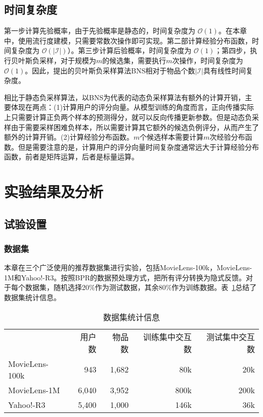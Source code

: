 \subsection{时间复杂度}
第一步计算先验概率，由于先验概率是静态的，时间复杂度为 $\mathcal{O}(1)$。在本章中，使用流行度建模，只需要常数次操作即可实现。第二部计算经验分布函数，时间复杂度为 $\mathcal{O}(\vert\mathcal{I}\vert)$）。第三步计算后验概率，时间复杂度为 $\mathcal{O}(1)$；第四步，执行贝叶斯负采样，对于规模为$m$的候选集，需要执行$m$次操作，时间复杂度为 $\mathcal{O}(1)$。因此，提出的贝叶斯负采样算法BNS相对于物品个数$|\mathcal{I}|$具有线性时间复杂度。

相比于静态负采样算法，以BNS为代表的动态负采样算法有额外的计算开销，主要体现在两点：(1)计算用户的评分向量。从模型训练的角度而言，正向传播实际上只需要计算正负两个样本的预测得分，就可以反向传播更新参数。但是动态负采样由于需要采样困难负样本，所以需要计算其它额外的候选负例评分，从而产生了额外的计算开销。(2)计算经验分布函数。$m$个候选样本需要计算$m$次经验分布函数。但是需要注意的是，计算用户的评分向量时间复杂度通常远大于计算经验分布函数，前者是矩阵运算，后者是标量运算。

\section{实验结果及分析}
\subsection{试验设置}
\subsubsection{数据集}
本章在三个广泛使用的推荐数据集进行实验，包括MovieLens-100k，MovieLens-1M和Yahoo!-R3\cite{Xuejiao:2020:ASC}。按照BPR\cite{Steffen:2009:UAI}的数据预处理方式，把所有评分转换为隐式反馈。对于每个数据集，随机选择20\%作为测试数据，其余80\%作为训练数据。表~\ref{3Table:Dataset}总结了数据集统计信息。
\begin{table}[h]
	\centering
	\small
	\caption{数据集统计信息}\label{3Table:Dataset}
	\begin{tabular}{lrrrr}
		\toprule[1.2pt]
		~           & 用户数   & 物品数   & 训练集中交互数  &测试集中交互数  \\ \cline{1-5}
		MovieLens-100k   &   943    &  1,682   &    80k	   & 20k 	\\
		MovieLens-1M    &   6,040  &  3,952   &   800k     & 200k  \\
		Yahoo!-R3       &   5,400  &  1,000   &   146k      & 36k  \\
		\bottomrule[1.2pt]
	\end{tabular}
\end{table}
\newpage
